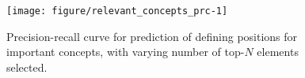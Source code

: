 \begin{knitrout}
\color{fgcolor}\begin{figure}[!htbp]

{\centering \texttt{[image: figure/relevant\_concepts\_prc-1]} 

}

\caption[Precision-recall curve for prediction of defining positions for important concepts, with varying number of top-$N$ elements selected]{Precision-recall curve for prediction of defining positions for important concepts, with varying number of top-$N$ elements selected.}\label{fig:relevant_concepts_prc}
\end{figure}

\end{knitrout}
